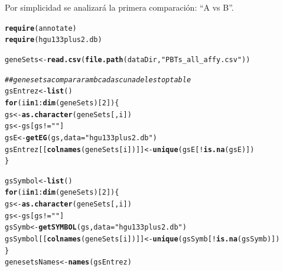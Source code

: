\documentclass[a4paper]{article}\usepackage[]{graphicx}\usepackage[]{color}
\makeatletter
\newcommand{\hlnum}[1]{\textcolor[rgb]{0.686,0.059,0.569}{#1}}%
\newcommand{\hlstr}[1]{\textcolor[rgb]{0.192,0.494,0.8}{#1}}%
\newcommand{\hlcom}[1]{\textcolor[rgb]{0.678,0.584,0.686}{\textit{#1}}}%
\newcommand{\hlopt}[1]{\textcolor[rgb]{0,0,0}{#1}}%
\newcommand{\hlstd}[1]{\textcolor[rgb]{0.345,0.345,0.345}{#1}}%
\newcommand{\hlkwa}[1]{\textcolor[rgb]{0.161,0.373,0.58}{\textbf{#1}}}%
\newcommand{\hlkwb}[1]{\textcolor[rgb]{0.69,0.353,0.396}{#1}}%
\newcommand{\hlkwc}[1]{\textcolor[rgb]{0.333,0.667,0.333}{#1}}%
\newcommand{\hlkwd}[1]{\textcolor[rgb]{0.737,0.353,0.396}{\textbf{#1}}}%
\newenvironment{kframe}{%
 \def\at@end@of@kframe{}%
 \ifinner\ifhmode%
  \def\at@end@of@kframe{\end{minipage}}%
  \begin{minipage}{\columnwidth}%
 \fi\fi%
 \def\FrameCommand##1{\hskip\@totalleftmargin \hskip-\fboxsep
 \colorbox{shadecolor}{##1}\hskip-\fboxsep
     \hskip-\linewidth \hskip-\@totalleftmargin \hskip\columnwidth}%
 \MakeFramed {\advance\hsize-\width
   \@totalleftmargin\z@ \linewidth\hsize
   \@setminipage}}%
 {\par\unskip\endMakeFramed%
 \at@end@of@kframe}
\newenvironment{knitrout}{}{} %
\makeatother
\begin{document}
Por simplicidad se analizará la primera comparaci\'on: ``A vs B''.

\begin{knitrout}
\color{fgcolor}\begin{kframe}
\begin{alltt}
\hlkwd{require}\hlstd{(annotate)}
\hlkwd{require}\hlstd{(hgu133plus2.db)}
\end{alltt}


{\ttfamily\noindent\itshape\color{messagecolor}{\#\# Loading required package: hgu133plus2.db}}

{\ttfamily\noindent\itshape\color{messagecolor}{\#\# }}\begin{alltt}
\hlstd{geneSets} \hlkwb{<-} \hlkwd{read.csv}\hlstd{(}\hlkwd{file.path}\hlstd{(dataDir,} \hlstr{"PBTs_all_affy.csv"}\hlstd{))}

\hlcom{## gene sets a comparar amb cadascuna de les toptable}
\hlstd{gsEntrez} \hlkwb{<-} \hlkwd{list}\hlstd{()}
\hlkwa{for} \hlstd{(i} \hlkwa{in} \hlnum{1}\hlopt{:}\hlkwd{dim}\hlstd{(geneSets)[}\hlnum{2}\hlstd{]) \{}
  \hlstd{gs} \hlkwb{<-} \hlkwd{as.character}\hlstd{(geneSets[,i])}
  \hlstd{gs} \hlkwb{<-} \hlstd{gs[gs} \hlopt{!=} \hlstr{""}\hlstd{]}
  \hlstd{gsE} \hlkwb{<-} \hlkwd{getEG}\hlstd{(gs,} \hlkwc{data} \hlstd{=} \hlstr{"hgu133plus2.db"}\hlstd{)}
  \hlstd{gsEntrez[[}\hlkwd{colnames}\hlstd{(geneSets[i])]]} \hlkwb{<-} \hlkwd{unique}\hlstd{(gsE[}\hlopt{!}\hlkwd{is.na}\hlstd{(gsE)])}
\hlstd{\}}

\hlstd{gsSymbol} \hlkwb{<-} \hlkwd{list}\hlstd{()}
\hlkwa{for} \hlstd{(i} \hlkwa{in} \hlnum{1}\hlopt{:}\hlkwd{dim}\hlstd{(geneSets)[}\hlnum{2}\hlstd{]) \{}
  \hlstd{gs} \hlkwb{<-} \hlkwd{as.character}\hlstd{(geneSets[,i])}
  \hlstd{gs} \hlkwb{<-} \hlstd{gs[gs} \hlopt{!=} \hlstr{""}\hlstd{]}
  \hlstd{gsSymb} \hlkwb{<-} \hlkwd{getSYMBOL}\hlstd{(gs,}\hlkwc{data} \hlstd{=} \hlstr{"hgu133plus2.db"}\hlstd{)}
  \hlstd{gsSymbol[[}\hlkwd{colnames}\hlstd{(geneSets[i])]]} \hlkwb{<-} \hlkwd{unique}\hlstd{(gsSymb[}\hlopt{!}\hlkwd{is.na}\hlstd{(gsSymb)])}
\hlstd{\}}
\hlstd{genesetsNames} \hlkwb{<-} \hlkwd{names}\hlstd{(gsEntrez)}
\end{alltt}
\end{kframe}
\end{knitrout}
\end{document}
